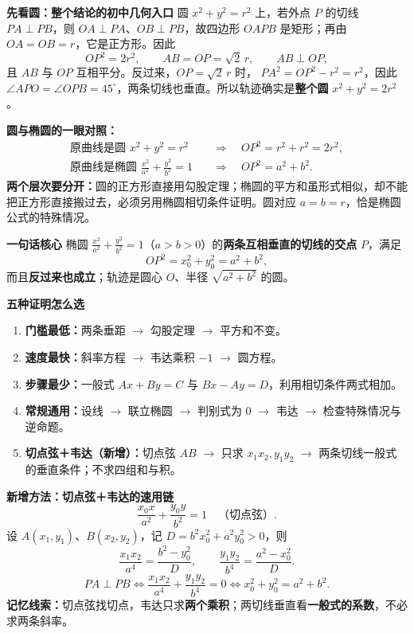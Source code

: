 \clearpage
\begin{summarybox}
  \textbf{\textcolor{CSummary}{先看圆：整个结论的初中几何入口}}
  圆 $x^2+y^2=r^2$ 上，若外点 $P$ 的切线 $PA\perp PB$，则 $OA\perp PA$、$OB\perp PB$，故四边形 $OAPB$ 是矩形；再由 $OA=OB=r$，它是正方形。因此
  \[
    \boxed{OP^2=2r^2},\qquad
    \boxed{AB=OP=\sqrt2\,r},\qquad
    \boxed{AB\perp OP},
  \]
  且 $AB$ 与 $OP$ 互相平分。反过来，$OP=\sqrt2\,r$ 时，
  $PA^2=OP^2-r^2=r^2$，因此 $\angle APO=\angle OPB=45^\circ$，两条切线也垂直。所以轨迹确实是\textbf{整个圆} $\boxed{x^2+y^2=2r^2}$。

  \textbf{圆与椭圆的一眼对照：}
  \[
    \begin{aligned}
      \text{原曲线是圆 }x^2+y^2=r^2
         &\quad\Longrightarrow\quad OP^2=r^2+r^2=2r^2,\\
      \text{原曲线是椭圆 }\frac{x^2}{a^2}+\frac{y^2}{b^2}=1
         &\quad\Longrightarrow\quad OP^2=a^2+b^2.
    \end{aligned}
  \]
  \textbf{两个层次要分开：}圆的正方形直接用勾股定理；椭圆的平方和虽形式相似，却不能把正方形直接搬过去，必须另用椭圆相切条件证明。圆对应 $a=b=r$，恰是椭圆公式的特殊情况。

  \medskip

  \textbf{\textcolor{CSummary}{一句话核心}}
  椭圆 $\frac{x^2}{a^2}+\frac{y^2}{b^2}=1$（$a>b>0$）的\textbf{两条互相垂直的切线的交点} $P$，满足
  \[
    \boxed{OP^2=x_0^2+y_0^2=a^2+b^2},
  \]
  而且\textbf{反过来也成立}；轨迹是圆心 $O$、半径 $\sqrt{a^2+b^2}$ 的圆。

  \medskip
  \textbf{\textcolor{CSummary}{五种证明怎么选}}
  \begin{enumerate}[leftmargin=*, itemsep=0.25em]
    \item \textbf{门槛最低：}两条垂距 $\rightarrow$ 勾股定理 $\rightarrow$ 平方和不变。
    \item \textbf{速度最快：}斜率方程 $\rightarrow$ 韦达乘积 $-1$ $\rightarrow$ 圆方程。
    \item \textbf{步骤最少：}一般式 $Ax+By=C$ 与 $Bx-Ay=D$，利用相切条件两式相加。
    \item \textbf{常规通用：}设线 $\rightarrow$ 联立椭圆 $\rightarrow$ 判别式为 $0$ $\rightarrow$ 韦达 $\rightarrow$ 检查特殊情况与逆命题。
    \item \textbf{切点弦＋韦达（新增）：}切点弦 $AB$ $\rightarrow$ 只求 $x_1x_2,y_1y_2$ $\rightarrow$ 两条切线一般式的垂直条件；不求四组和与积。
  \end{enumerate}

  \medskip
  \textbf{\textcolor{CSummary}{新增方法：切点弦＋韦达的速用链}}
  \[
    \frac{x_0x}{a^2}+\frac{y_0y}{b^2}=1
    \quad\text{（切点弦）}.
  \]
  设 $A(x_1,y_1)$、$B(x_2,y_2)$，记 $D=b^2x_0^2+a^2y_0^2>0$，则
  \[
    \frac{x_1x_2}{a^4}=\frac{b^2-y_0^2}{D},\qquad
    \frac{y_1y_2}{b^4}=\frac{a^2-x_0^2}{D}.
  \]
  \[
    PA\perp PB
    \Longleftrightarrow\frac{x_1x_2}{a^4}+\frac{y_1y_2}{b^4}=0
    \Longleftrightarrow\boxed{x_0^2+y_0^2=a^2+b^2}.
  \]
  \textbf{记忆线索：}切点弦找切点，韦达只求\textbf{两个乘积}；两切线垂直看\textbf{一般式的系数}，不必求两条斜率。


\end{summarybox}
